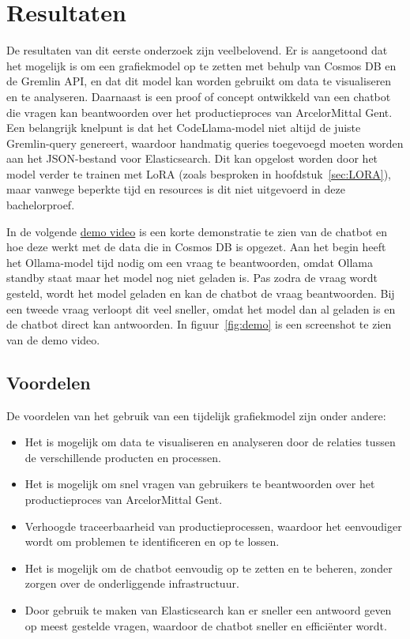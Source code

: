\section{Resultaten}
De resultaten van dit eerste onderzoek zijn veelbelovend. Er is aangetoond dat het mogelijk is om een grafiekmodel op te zetten met behulp van Cosmos DB en de Gremlin API, en dat dit model kan worden gebruikt om data te visualiseren en te analyseren.
Daarnaast is een proof of concept ontwikkeld van een chatbot die vragen kan beantwoorden over het productieproces van ArcelorMittal Gent.
Een belangrijk knelpunt is dat het CodeLlama-model niet altijd de juiste Gremlin-query genereert, waardoor handmatig queries toegevoegd moeten worden aan het JSON-bestand voor Elasticsearch.
Dit kan opgelost worden door het model verder te trainen met LoRA (zoals besproken in hoofdstuk~\ref{sec:LORA}), maar vanwege beperkte tijd en resources is dit niet uitgevoerd in deze bachelorproef.

In de volgende \href{https://youtu.be/D4-bSRYDLWM}{demo video} is een korte demonstratie te zien van de chatbot en hoe deze werkt met de data die in Cosmos DB is opgezet.\@
Aan het begin heeft het Ollama-model tijd nodig om een vraag te beantwoorden, omdat Ollama standby staat maar het model nog niet geladen is.
Pas zodra de vraag wordt gesteld, wordt het model geladen en kan de chatbot de vraag beantwoorden.
Bij een tweede vraag verloopt dit veel sneller, omdat het model dan al geladen is en de chatbot direct kan antwoorden.
In figuur~\ref{fig:demo} is een screenshot te zien van de demo video.

\subsection{Voordelen}
De voordelen van het gebruik van een tijdelijk grafiekmodel zijn onder andere:
\begin{itemize}
    \item Het is mogelijk om data te visualiseren en analyseren door de relaties tussen de verschillende producten en processen.
    \item Het is mogelijk om snel vragen van gebruikers te beantwoorden over het productieproces van ArcelorMittal Gent.
    \item Verhoogde traceerbaarheid van productieprocessen, waardoor het eenvoudiger wordt om problemen te identificeren en op te lossen.
    \item Het is mogelijk om de chatbot eenvoudig op te zetten en te beheren, zonder zorgen over de onderliggende infrastructuur.
    \item Door gebruik te maken van Elasticsearch kan er sneller een antwoord geven op meest gestelde vragen, waardoor de chatbot sneller en efficiënter wordt.
\end{itemize}

